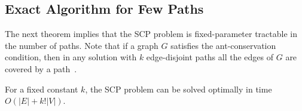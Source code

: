 \documentclass{llncs}
\newcommand{\SCoP}{\textsc{SCP}}
\begin{document}
\subsection{Exact Algorithm for Few Paths}


The next theorem implies that the \SCoP{} problem is
fixed-parameter tractable in the number of paths.
Note that if a graph $G$ satisfies the ant-conservation condition, then
in any solution with $k$ edge-disjoint paths all the edges of $G$
are covered by a path~\cite{Marx04}. 


\begin{theorem}
\label{thm:fpt}
For a fixed constant $k$, the \SCoP{} problem can be solved optimally
in time $O(|E| + k!|V|)$.
\end{theorem}
\end{document}
